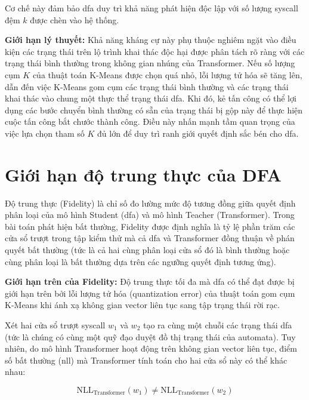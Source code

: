 \documentclass[../main.tex]{subfiles}
\begin{document}
Cơ chế này đảm bảo \gls{dfa} duy trì khả năng phát hiện độc lập với số
lượng \gls{syscall} đệm $k$ được chèn vào hệ thống.

\textbf{Giới hạn lý thuyết:} Khả năng kháng cự này phụ thuộc nghiêm
ngặt vào điều kiện các trạng thái trên lộ trình khai thác độc hại
được phân tách rõ ràng với các trạng thái bình thường trong không
gian nhúng của Transformer. Nếu số lượng cụm $K$ của thuật toán
K-Means được chọn quá nhỏ, lỗi lượng tử hóa sẽ tăng lên, dẫn đến việc
K-Means gom cụm các trạng thái bình thường và các trạng thái khai
thác vào chung một thực thể trạng thái \gls{dfa}. Khi đó, kẻ tấn công có
thể lợi dụng các bước chuyển bình thường có sẵn của trạng thái bị gộp
này để thực hiện cuộc tấn công bắt chước thành công. Điều này nhấn
mạnh tầm quan trọng của việc lựa chọn tham số $K$ đủ lớn để duy trì
ranh giới quyết định sắc bén cho \gls{dfa}.

\section{Giới hạn độ trung thực của DFA}
\label{sec:dfa_fidelity_bound}

Độ trung thực (Fidelity) là chỉ số đo lường mức độ tương đồng giữa
quyết định phân loại của mô hình Student (\gls{dfa}) và mô hình Teacher
(Transformer). Trong bài toán phát hiện bất thường, Fidelity được
định nghĩa là tỷ lệ phần trăm các cửa sổ trượt trong tập kiểm thử mà
cả \gls{dfa} và Transformer đồng thuận về phán quyết bất thường (tức là cả
  hai cùng phân loại cửa sổ đó là bình thường hoặc cùng phân loại là
bất thường dựa trên các ngưỡng quyết định tương ứng).

\textbf{Giới hạn trên của Fidelity:} Độ trung thực tối đa mà \gls{dfa} có
thể đạt được bị giới hạn trên bởi lỗi lượng tử hóa (quantization
error) của thuật toán gom cụm K-Means khi ánh xạ không gian vector
liên tục sang tập trạng thái rời rạc.

Xét hai cửa sổ trượt \gls{syscall} $w_1$ và $w_2$ tạo ra cùng một chuỗi các
trạng thái \gls{dfa} (tức là chúng có cùng một quỹ đạo duyệt đồ thị trạng
thái của automata). Tuy nhiên, do mô hình Transformer hoạt động trên
không gian vector liên tục, điểm số bất thường (\gls{nll}) mà Transformer tính toán cho hai cửa sổ này có
thể khác nhau:

\begin{equation}
  \label{eq:nll_difference}
  \text{NLL}_{\text{Transformer}}(w_1) \neq \text{NLL}_{\text{Transformer}}(w_2)
\end{equation}
\end{document}
